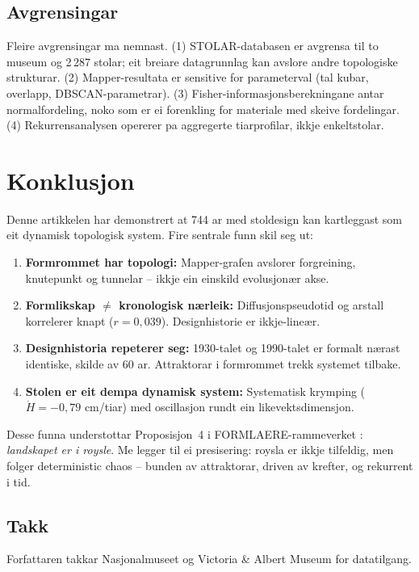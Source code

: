 \documentclass[10pt, a4paper, twocolumn]{article}
\begin{document}
\subsection{Avgrensingar}

Fleire avgrensingar ma nemnast. (1) STOLAR-databasen er avgrensa til to museum og 2\,287 stolar; eit breiare datagrunnlag kan avslo\-re andre topologiske strukturar. (2) Mapper-resultata er sensitive for parameterval (tal kubar, overlapp, DBSCAN-parametrar). (3) Fisher-informasjonsberekningane antar normalfordeling, noko som er ei forenkling for materiale med skeive fordelingar. (4) Rekurrensanalysen opererer pa aggregerte tiarprofilar, ikkje enkelt\-stolar.


\section{Konklusjon}

Denne artikkelen har demonstrert at 744 ar med stoldesign kan kartleggast som eit dynamisk topologisk system. Fire sentrale funn skil seg ut:

\begin{enumerate}[leftmargin=*, topsep=3pt, itemsep=2pt]
  \item \textbf{Formrommet har topologi:} Mapper-grafen avslorer forgreining, knutepunkt og tunnelar -- ikkje ein einskild evolusjon\ae{}r akse.
  \item \textbf{Formlikskap $\neq$ kronologisk n\ae{}rleik:} Diffusjonspseudotid og arstall korrelerer knapt ($r = 0{,}039$). Designhistorie er ikkje-line\ae{}r.
  \item \textbf{Designhistoria repeterer seg:} 1930-talet og 1990-talet er formalt n\ae{}rast identiske, skilde av 60 ar. Attrakto\-rar i formrommet trekk systemet tilbake.
  \item \textbf{Stolen er eit dempa dynamisk system:} Systematisk krymping ($\dot{H} = -0{,}79$ cm/tiar) med oscillasjon rundt ein likevektsdimensjon.
\end{enumerate}

Desse funna understot\-tar Proposisjon~4 i FORMLAERE-rammeverket \citep{finne2026}: \emph{landskapet er i roysle}. Me legger til ei presisering: roysla er ikkje tilfeldig, men folger deterministic chaos -- bunden av attraktorar, driven av krefter, og rekurrent i tid.

\small
\subsection*{Takk}
Forfattaren takkar Nasjonalmuseet og Victoria \& Albert Museum for datatilgang.
\end{document}
